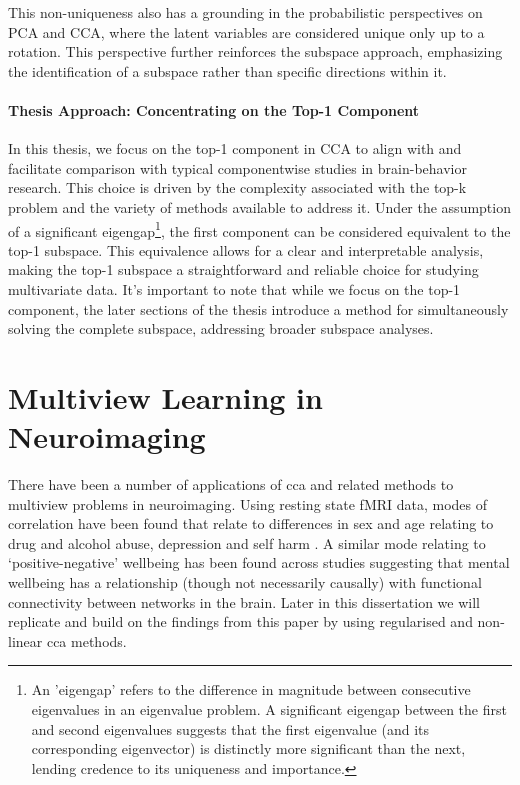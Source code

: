 This non-uniqueness also has a grounding in the probabilistic perspectives on PCA and CCA, where the latent variables are considered unique only up to a rotation.
This perspective further reinforces the subspace approach, emphasizing the identification of a subspace rather than specific directions within it.

\paragraph{Thesis Approach: Concentrating on the Top-1 Component}

In this thesis, we focus on the top-1 component in CCA to align with and facilitate comparison with typical componentwise studies in brain-behavior research. This choice is driven by the complexity associated with the top-k problem and the variety of methods available to address it. Under the assumption of a significant eigengap\footnote{An 'eigengap' refers to the difference in magnitude between consecutive eigenvalues in an eigenvalue problem. A significant eigengap between the first and second eigenvalues suggests that the first eigenvalue (and its corresponding eigenvector) is distinctly more significant than the next, lending credence to its uniqueness and importance.}, the first component can be considered equivalent to the top-1 subspace. This equivalence allows for a clear and interpretable analysis, making the top-1 subspace a straightforward and reliable choice for studying multivariate data. It's important to note that while we focus on the top-1 component, the later sections of the thesis introduce a method for simultaneously solving the complete subspace, addressing broader subspace analyses.


\section{Multiview Learning in Neuroimaging}

There have been a number of applications of \acrshort{cca} and related methods to multiview problems in neuroimaging.
Using resting state fMRI data, modes of correlation have been found that relate to differences in sex and age relating to drug and alcohol abuse, depression and self harm \citep{mihalik2019brain}.
A similar mode relating to `positive-negative' wellbeing has been found across studies \citep{smith2015positive} suggesting that mental wellbeing has a relationship (though not necessarily causally) with functional connectivity between networks in the brain.
Later in this dissertation we will replicate and build on the findings from this paper by using regularised and non-linear \acrshort{cca} methods.

